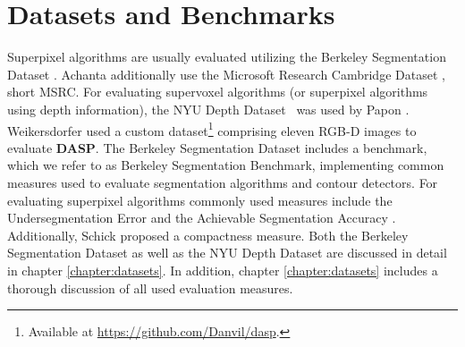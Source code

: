 \section{Datasets and Benchmarks}

Superpixel algorithms are usually evaluated utilizing the Berkeley Segmentation Dataset \cite{ArbelaezMaireFowlkesMalik:2011}. Achanta \etal \cite{AchantaShajiSmithLucchiFuaSuesstrunk:2012} additionally use the Microsoft Research Cambridge Dataset \cite{ShottonWinnRotherCriminisi:2009}, short MSRC. For evaluating supervoxel algorithms (or superpixel algorithms using depth information), the NYU Depth Dataset~\cite{SilbermanHoiemKohliFergus:2012} was used by Papon \etal \cite{PaponAbramovSchoelerWoergoetter:2013}. Weikersdorfer \etal \cite{WeikersdorferGossowBeetz:2012} used a custom dataset\footnote{Available at \url{https://github.com/Danvil/dasp}.} comprising eleven RGB-D images to evaluate \textbf{DASP}. The Berkeley Segmentation Dataset includes a benchmark, which we refer to as Berkeley Segmentation Benchmark, implementing common measures used to evaluate segmentation algorithms and contour detectors. For evaluating superpixel algorithms commonly used measures include the Undersegmentation Error \cite{LevinshteinStereKutulakosFleetDickinsonSiddiqi:2009, LiuTuzelRamalingamChellappa:2011} and the Achievable Segmentation Accuracy \cite{LiuTuzelRamalingamChellappa:2011}. Additionally, Schick \etal \cite{SchickFischerStiefelhagen:2012} proposed a compactness measure. Both the Berkeley Segmentation Dataset as well as the NYU Depth Dataset are discussed in detail in chapter \ref{chapter:datasets}. In addition, chapter \ref{chapter:datasets} includes a thorough discussion of all used evaluation measures.